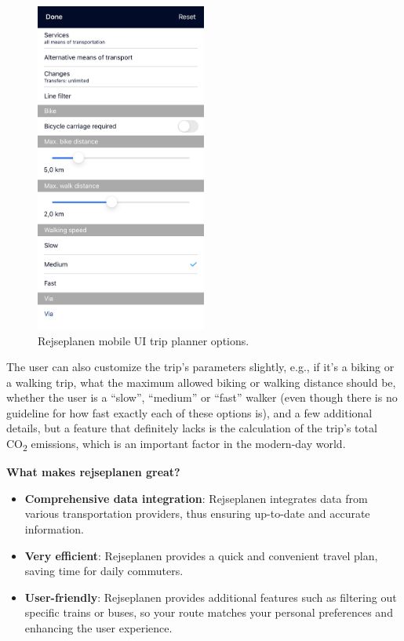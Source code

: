 \begin{figure}
    \centering
    \includegraphics[width=0.5\textwidth]{images/rejseplanen-options}
    \caption{Rejseplanen mobile UI trip planner options.}
    \label{fig:figure9}
\end{figure}

The user can also customize the trip's parameters slightly, e.g., if it's a biking or a walking trip, what the maximum
allowed biking or walking distance should be, whether the user is a ``slow'', ``medium'' or ``fast'' walker (even though
there is no guideline for how fast exactly each of these options is), and a few additional details, but a feature that
definitely lacks is the calculation of the trip’s total \unit{CO_{2}} emissions, which is an important factor in the
modern-day world.

\textbf{What makes rejseplanen great?}
\begin{itemize}
    \item \textbf{Comprehensive data integration}: Rejseplanen integrates data from various transportation providers,
    thus ensuring up-to-date and accurate information.
    \item \textbf{Very efficient}: Rejseplanen provides a quick and convenient travel plan, saving time for daily
    commuters.
    \item \textbf{User-friendly}: Rejseplanen provides additional features such as filtering out specific trains or
    buses, so your route matches your personal preferences and enhancing the user experience.
\end{itemize}

